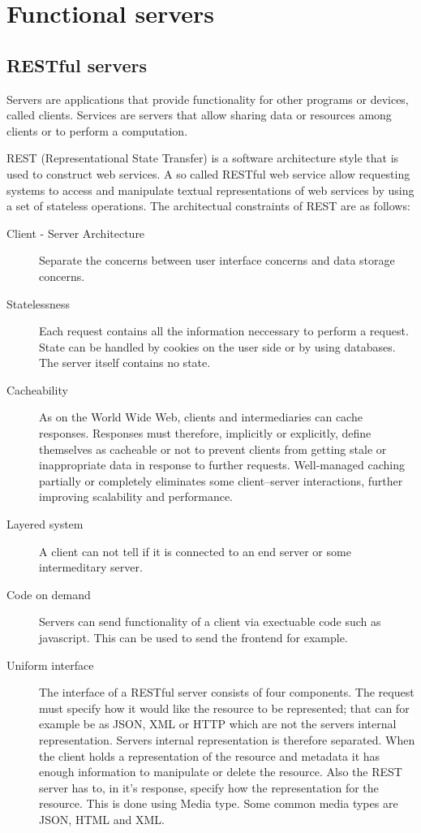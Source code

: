 \section{Functional servers}

\theoremstyle{definition}
\newtheorem{exmp}{Example}[section]
\subsection{RESTful servers}


Servers are applications that provide functionality for other programs or
devices, called clients. Services are servers that allow sharing data or
resources among clients or to perform a computation.

REST (Representational State Transfer) is a software architecture style that is
used to construct web services. A so called RESTful web service allow requesting
systems to access and manipulate textual representations of web services by
using a set of stateless operations. The architectual constraints of REST are as
follows:

\begin{description}
\item[ Client - Server Architecture ] Separate the concerns between user
interface concerns and data storage concerns.
\item[Statelessness] Each request contains all the information neccessary to
perform a request. State can be handled by cookies on the user side or by using
databases. The server itself contains no state.
\item[Cacheability] As on the World Wide Web, clients and intermediaries can
cache responses. Responses must therefore, implicitly or explicitly, define
themselves as cacheable or not to prevent clients from getting stale or
inappropriate data in response to further requests. Well-managed caching
partially or completely eliminates some client–server interactions, further
improving scalability and performance. 
\item[Layered system] A client can not tell if it is connected to an end server
or some intermeditary server. 
\item[Code on demand] Servers can send functionality of a client via exectuable
code such as javascript. This can be used to send the frontend for example.
\item[Uniform interface] The interface of a RESTful server consists of four
components. The request must specify how it would like the resource to be
represented; that can for example be as JSON, XML or HTTP which are not the
servers internal representation. Servers internal representation is therefore
separated. When the client holds a representation of the resource and metadata
it has enough information to manipulate or delete the resource. Also the REST
server has to, in it's response, specify how the representation for the
resource. This is done using Media type. Some common media types are JSON, HTML
and XML.
\end{description}

